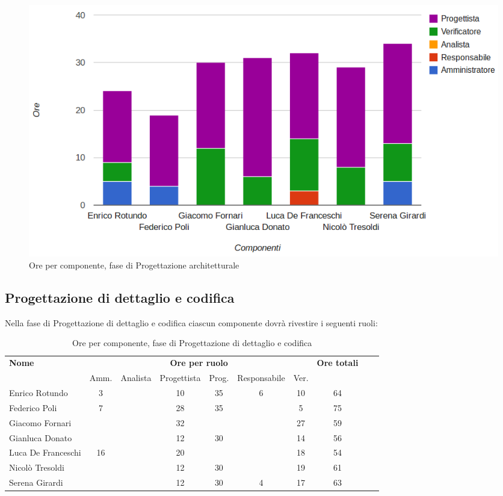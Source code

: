 \begin{figure}[H]
\centering
\includegraphics[scale=0.35]{4-2.png}
\caption{Ore per componente, fase di Progettazione architetturale\label{fig:nome}}
\end{figure}

\subsection{Progettazione di dettaglio e codifica}

Nella fase di Progettazione di dettaglio e codifica ciascun componente dovrà rivestire i seguenti ruoli:

\begin{table}[H]
\centering
\begin{tabular}{lccccccccc}
\toprule 
    \textbf{Nome}  & \multicolumn{6}{c}{\textbf{Ore per ruolo}} & \textbf{Ore totali}\\
    & Amm. & Analista & Progettista
    & Prog. & Responsabile & Ver. \\
    \midrule
    Enrico Rotundo   	& 3 &  &	 10	& 35 & 6 & 10 &	64 \\
    Federico Poli  		& 7	&  &	 28	& 35 &   & 5  & 75 \\
    Giacomo Fornari		& 	&  &	 32	&    &   & 27 & 59 \\
    Gianluca Donato 		& 	&  &	 12	& 30 &   & 14 & 56 \\
    Luca De Franceschi 	& 16	&  &	 20	&    &   & 18 & 54 \\
    Nicolò Tresoldi 		& 	&  &	 12	& 30 &   & 19 & 61 \\
   	Serena Girardi 		& 	&  &	 12	& 30 & 4 & 17 & 63 \\
    
    \bottomrule
\end{tabular}
\caption{Ore per componente, fase di Progettazione di dettaglio e codifica}
\end{table}

